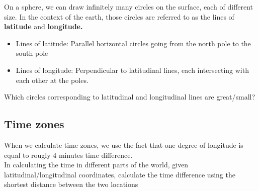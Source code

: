 \documentclass{article}
\begin{document}
On a sphere, we can draw infinitely many circles on the surface, each of different size. In the context of the earth, those circles are referred to as the lines of \textbf{latitude} and \textbf{longitude.} 

\begin{itemize}
	\item Lines of latitude: Parallel horizontal circles going from the north pole to the south pole
	\item Lines of longitude: Perpendicular to latitudinal lines, each intersecting with each other at the poles.
\end{itemize}

Which circles corresponding to latitudinal and longitudinal lines are great/small?

\subsection{Time zones}

When we calculate time zones, we use the fact that one degree of longitude is equal to rougly 4 minutes time difference. \\

In calculating the time in different parts of the world, given latitudinal/longitudinal coordinates, calculate the time difference using the shortest distance between the two locations
\end{document}
